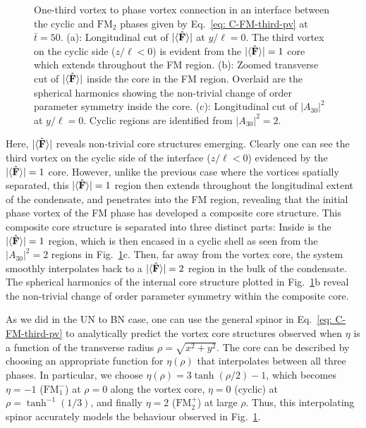 \begin{figure}
    \caption[Dynamics of a one-third vortex to singly quantised vortex
    connection in a cyclic to ferromagnetic interface]
    {\label{fig: C-FM-third-SQV}One-third vortex to phase vortex connection in
    an interface between the cyclic and \(\text{FM}_2\) phases given by
    Eq.~\eqref{eq: C-FM-third-pv} at \(\bar{t} = 50\).
    (a): Longitudinal cut of \(|\langle \hat{\vb{F}} \rangle | \) at \(y/\ell=0\).
    The third vortex on the cyclic side (\(z/\ell < 0\)) is evident from the
    \(|\langle \hat{\vb{F}} \rangle | = 1\) core which extends throughout the FM region.
    (b): Zoomed transverse cut of \(|\langle \hat{\vb{F}} \rangle | \) inside the core in the FM
    region.
    Overlaid are the spherical harmonics showing the non-trivial change
    of order parameter symmetry inside the core.
    (c): Longitudinal cut of \(|A_{30}|^2\) at \(y/\ell=0\).
    Cyclic regions are identified from \(|A_{30}|^2=2\).}
\end{figure}
Here, \(|\langle \hat{\vb{F}} \rangle | \) reveals non-trivial core structures emerging.
Clearly one can see the third vortex on the cyclic side of the interface
(\(z/\ell < 0\)) evidenced by the \(|\langle \hat{\vb{F}} \rangle | = 1\) core.
However, unlike the previous case where the vortices spatially separated, this
\(|\langle \hat{\vb{F}} \rangle | = 1\) region then extends throughout the longitudinal extent of the
condensate, and penetrates into the FM region, revealing that the initial phase
vortex of the FM phase has developed a composite core structure.
This composite core structure is separated into three distinct parts:
Inside is the \(|\langle \hat{\vb{F}} \rangle | = 1\) region, which is then encased in a cyclic shell
as seen from the \(|A_{30}|^2=2\) regions in Fig.~\ref{fig: C-FM-third-SQV}c.
Then, far away from the vortex core, the system smoothly interpolates back to
a \(|\langle \hat{\vb{F}} \rangle | = 2\) region in the bulk of the condensate.
The spherical harmonics of the internal core structure plotted in
Fig.~\ref{fig: C-FM-third-SQV}b reveal the non-trivial change of order parameter
symmetry within the composite core.

As we did in the UN to BN case, one can use the general spinor in
Eq.~\eqref{eq: C-FM-third-pv} to analytically predict the vortex core structures
observed when \(\eta \) is a function of the transverse radius
\(\rho = \sqrt{x^2 + y^2}\).
The core can be described by choosing an appropriate function for
\(\eta(\rho)\) that interpolates between all three phases.
In particular, we choose \(\eta(\rho) = 3\tanh(\rho/2) - 1\), which becomes
\(\eta=-1\) (\(\text{FM}_1^-\)) at \(\rho=0\) along the vortex core, \(\eta=0\)
(cyclic) at \(\rho=\tanh^{-1}(1/3)\), and finally \(\eta=2\) (\(\text{FM}_2^+\))
at large \(\rho \).
Thus, this interpolating spinor accurately models the behaviour observed in
Fig.~\ref{fig: C-FM-third-SQV}.

